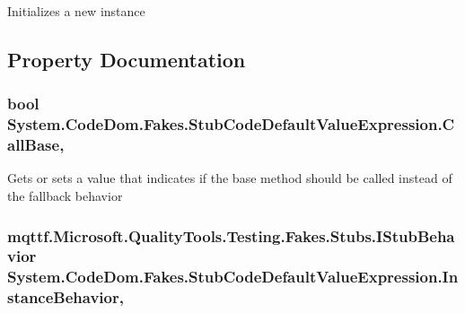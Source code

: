 Initializes a new instance



\subsection{Property Documentation}
\hypertarget{class_system_1_1_code_dom_1_1_fakes_1_1_stub_code_default_value_expression_a03ca6db45408e2020a0243962d01e694}{
\subsubsection[{Call\-Base}]{\setlength{\rightskip}{0pt plus 5cm}bool System.\-Code\-Dom.\-Fakes.\-Stub\-Code\-Default\-Value\-Expression.\-Call\-Base\hspace{0.3cm}{\ttfamily [get]}, {\ttfamily [set]}}}\label{class_system_1_1_code_dom_1_1_fakes_1_1_stub_code_default_value_expression_a03ca6db45408e2020a0243962d01e694}


Gets or sets a value that indicates if the base method should be called instead of the fallback behavior

\hypertarget{class_system_1_1_code_dom_1_1_fakes_1_1_stub_code_default_value_expression_adb70ddc39e580847f86cee841181dcd4}{
\subsubsection[{Instance\-Behavior}]{\setlength{\rightskip}{0pt plus 5cm}mqttf.\-Microsoft.\-Quality\-Tools.\-Testing.\-Fakes.\-Stubs.\-I\-Stub\-Behavior System.\-Code\-Dom.\-Fakes.\-Stub\-Code\-Default\-Value\-Expression.\-Instance\-Behavior\hspace{0.3cm}{\ttfamily [get]}, {\ttfamily [set]}}}\label{class_system_1_1_code_dom_1_1_fakes_1_1_stub_code_default_value_expression_adb70ddc39e580847f86cee841181dcd4}


